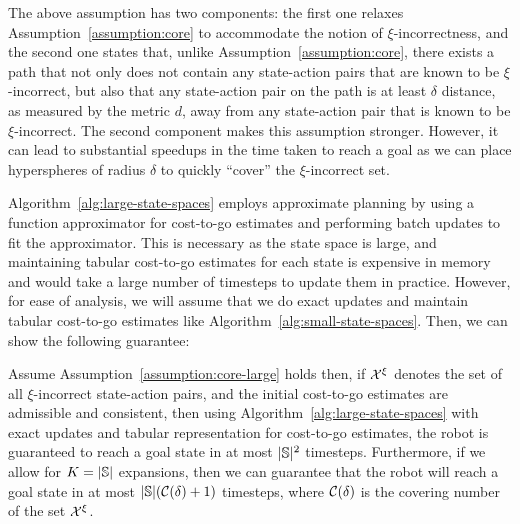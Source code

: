 The above assumption has two components: the first one relaxes
Assumption~\ref{assumption:core} to accommodate the notion of
$\xi$-incorrectness, and the second one states that, unlike
Assumption~\ref{assumption:core}, there exists a path that not only
does not contain any state-action pairs that are known to be
$\xi$-incorrect, but also that any state-action pair on the path is at
least $\delta$ distance, as measured by the metric $d$, away from any
state-action pair that is known to be $\xi$-incorrect. The second
component makes this assumption stronger. However, it can lead to
substantial speedups in the time taken to reach a goal as we can place
hyperspheres of radius $\delta$ to quickly ``cover'' the
$\xi$-incorrect set.

Algorithm~\ref{alg:large-state-spaces} employs approximate planning by
using a function approximator for cost-to-go estimates and performing
batch updates to fit the approximator. This is necessary as the state
space is large, and maintaining tabular cost-to-go estimates for
each state is expensive in memory and would take a large
number of timesteps to update them in practice. However, for
ease of analysis, we will assume that we do exact updates and maintain
tabular cost-to-go estimates like
Algorithm~\ref{alg:small-state-spaces}. Then, we can show the following
guarantee:
\begin{theorem}
  Assume Assumption~\ref{assumption:core-large} holds then, if
  $\mathcal{X}^\xi$ denotes the set of all
  $\xi$-incorrect state-action pairs, and the initial cost-to-go estimates
  are admissible and consistent, then using
  Algorithm~\ref{alg:large-state-spaces} with exact updates
  and tabular representation for cost-to-go estimates, the robot is
  guaranteed to
  reach a goal state in at most $|\mathbb{S}|^2$
  timesteps. Furthermore, if we allow for $K = |\mathbb{S}|$ expansions,
  then we can guarantee that the robot will
  reach a goal state in at most
  $|\mathbb{S}|(\mathcal{C}(\delta) + 1)$ timesteps, where
  $\mathcal{C}(\delta)$ is the covering number of the set
  $\mathcal{X}^\xi$.
  \label{thm:large-state-spaces}
\end{theorem}
